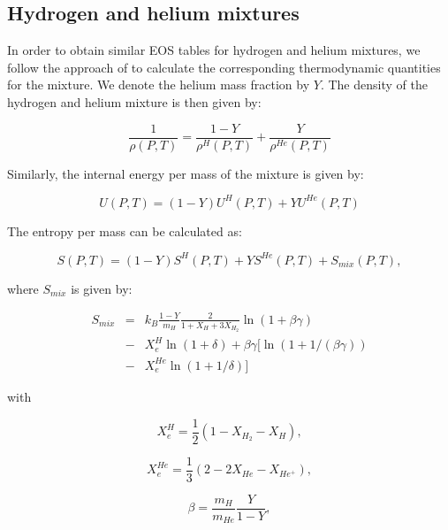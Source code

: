 \documentclass[apj]{emulateapj}
\begin{document}
\subsection{Hydrogen and helium mixtures}

In order to obtain similar EOS tables for hydrogen and helium mixtures, we follow the approach of \cite{saumon95} to calculate the corresponding thermodynamic quantities for the mixture. We denote the helium mass fraction by $Y$. The density of the hydrogen and helium mixture is then given by:

\begin{equation}
\label{eq:rhomixt}
\frac{1}{\rho(P, T)}=\frac{1-Y}{\rho^H(P,T)}+\frac{Y}{\rho^{He}(P,T)}
\end{equation}
 
Similarly, the internal energy per mass of the mixture is given by:

\begin{equation}
\label{eq:umixt}
U(P, T)=(1-Y)U^H(P,T)+Y U^{He}(P,T)
\end{equation}

The entropy per mass can be calculated as:

\begin{equation}
\label{eq:smixt}
S(P,T)=(1-Y)S^H(P,T)+Y S^{He}(P,T)+S_{mix}(P,T),
\end{equation}

\noindent where $S_{mix}$ is given by:

\begin{eqnarray}
\label{eq:smix}
S_{mix}&=&k_B \frac{1-Y}{m_H}\frac{2}{1+X_H+3X_{H_2}} {\ln(1+\beta \gamma)} \nonumber \\
&-&X_e^H \ln(1+\delta)+\beta \gamma [\ln(1+1/(\beta \gamma)) \nonumber \\
&-&X_e^{He} \ln(1+1/\delta)]
\end{eqnarray}

\noindent with 

\begin{equation}
\label{eq:xeH}
X_e^H=\frac{1}{2}(1-X_{H_2}-X_H),
\end{equation}

\begin{equation}
\label{eq:xe}
X_e^{He}=\frac{1}{3}(2-2X_{He}-X_{He^+}),
\end{equation}

\begin{equation}
\label{eq:beta}
\beta=\frac{m_H}{m_{He}} \frac{Y}{1-Y},
\end{equation}
\end{document}
